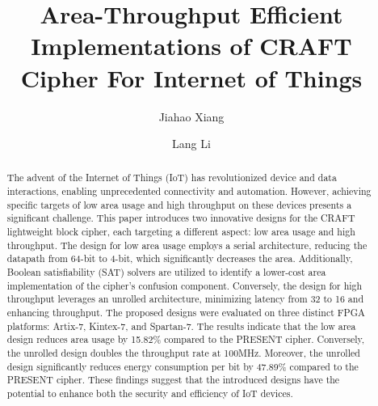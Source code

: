 \documentclass[final,5p,times,twocolumn]{elsarticle}
\begin{document}
\begin{frontmatter}

    \title{Area-Throughput Efficient Implementations of CRAFT Cipher For Internet of Things }

    \author[a,b]{Jiahao Xiang}
    \author[a,b]{Lang Li}







    \begin{abstract}
        The advent of the Internet of Things (IoT) has revolutionized device and data interactions, enabling unprecedented connectivity and automation. However, achieving specific targets of low area usage and high throughput on these devices presents a significant challenge. 
        This paper introduces two innovative designs for the CRAFT lightweight block cipher, each targeting a different aspect: low area usage and high throughput. The design for low area usage employs a serial architecture, reducing the datapath from 64-bit to 4-bit, which significantly decreases the area. Additionally, Boolean satisfiability (SAT) solvers are utilized to identify a lower-cost area implementation of the cipher's confusion component. Conversely, the design for high throughput leverages an unrolled architecture, minimizing latency from 32 to 16 and enhancing throughput.
        The proposed designs were evaluated on three distinct FPGA platforms: Artix-7, Kintex-7, and Spartan-7. The results indicate that the low area design reduces area usage by 15.82\% compared to the PRESENT cipher. Conversely, the unrolled design doubles the throughput rate at 100MHz. Moreover, the unrolled design significantly reduces energy consumption per bit by 47.89\% compared to the PRESENT cipher. These findings suggest that the introduced designs have the potential to enhance both the security and efficiency of IoT devices.
    \end{abstract}



\end{frontmatter}
\end{document}

